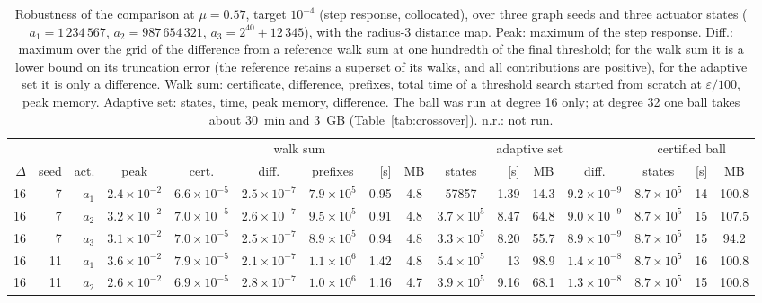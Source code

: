 \documentclass[aps,pra,superscriptaddress,floatfix,longbibliography,twocolumn]{revtex4-2}
\begin{document}
\begin{table}[t]
\footnotesize\setlength{\tabcolsep}{2.4pt}
\caption{Robustness of the comparison at $\mu=0.57$, target $10^{-4}$ (step response, collocated), over three graph seeds and three actuator states ($a_1=1\,234\,567$, $a_2=987\,654\,321$, $a_3=2^{40}+12\,345$), with the radius-3 distance map. Peak: maximum of the step response. Diff.: maximum over the grid of the difference from a reference walk sum at one hundredth of the final threshold; for the walk sum it is a lower bound on its truncation error (the reference retains a superset of its walks, and all contributions are positive), for the adaptive set it is only a difference. Walk sum: certificate, difference, prefixes, total time of a threshold search started from scratch at $\varepsilon/100$, peak memory. Adaptive set: states, time, peak memory, difference. The ball was run at degree 16 only; at degree 32 one ball takes about 30~min and 3~GB (Table~\ref{tab:crossover}). n.r.: not run.}\label{tab:ensemble}
\begin{ruledtabular}
\begin{tabular}{rrrc|cccrc|crcc|crc}
 & & & & \multicolumn{5}{c|}{walk sum} & \multicolumn{4}{c|}{adaptive set} & \multicolumn{3}{c}{certified ball}\\
$\Delta$ & seed & act. & peak & cert. & diff. & prefixes & [s] & MB & states & [s] & MB & diff. & states & [s] & MB\\\hline
16 & 7 & $a_1$ & $2.4\times10^{-2}$ & $6.6\times10^{-5}$ & $2.5\times10^{-7}$ & $7.9\times10^{5}$ & 0.95 & 4.8 & 57857 & 1.39 & 14.3 & $9.2\times10^{-9}$ & $8.7\times10^{5}$ & 14 & 100.8 \\
16 & 7 & $a_2$ & $3.2\times10^{-2}$ & $7.0\times10^{-5}$ & $2.6\times10^{-7}$ & $9.5\times10^{5}$ & 0.91 & 4.8 & $3.7\times10^{5}$ & 8.47 & 64.8 & $9.0\times10^{-9}$ & $8.7\times10^{5}$ & 15 & 107.5 \\
16 & 7 & $a_3$ & $3.1\times10^{-2}$ & $7.0\times10^{-5}$ & $2.5\times10^{-7}$ & $8.9\times10^{5}$ & 0.94 & 4.8 & $3.3\times10^{5}$ & 8.20 & 55.7 & $8.9\times10^{-9}$ & $8.7\times10^{5}$ & 15 & 94.2 \\
16 & 11 & $a_1$ & $3.6\times10^{-2}$ & $7.9\times10^{-5}$ & $2.1\times10^{-7}$ & $1.1\times10^{6}$ & 1.42 & 4.8 & $5.4\times10^{5}$ & 13 & 98.9 & $1.4\times10^{-8}$ & $8.7\times10^{5}$ & 16 & 100.8 \\
16 & 11 & $a_2$ & $2.6\times10^{-2}$ & $6.9\times10^{-5}$ & $2.8\times10^{-7}$ & $1.0\times10^{6}$ & 1.16 & 4.7 & $3.9\times10^{5}$ & 9.16 & 68.1 & $1.3\times10^{-8}$ & $8.7\times10^{5}$ & 15 & 100.8 \\

\end{tabular}
\end{ruledtabular}
\end{table}
\end{document}
